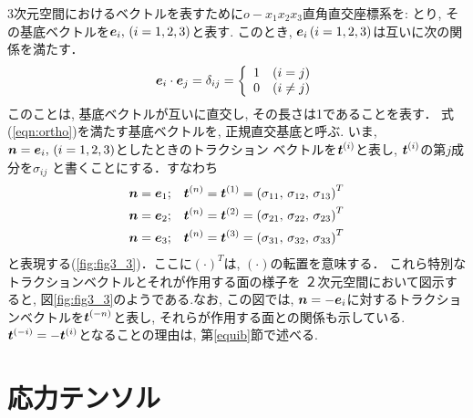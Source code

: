 \documentclass[10pt,a4j]{jarticle}
\begin{document}
3次元空間におけるベクトルを表すために$o-x_1x_2x_3$直角直交座標系を:
とり, その基底ベクトルを$\mbox{\boldmath $e$}_i,\, (i=1,2,3)$と表す.
このとき, $\mbox{\boldmath $e$}_i\, (i=1,2,3)$は互いに次の関係を満たす．
\begin{equation}
	\mbox{\boldmath $e$}_i\cdot \mbox{\boldmath $e$}_j=
	\delta_{ij}=
	\left\{
	\begin{array}{cc}
		1 & (i=j) \\
		0 & (i \neq j) \\
	\end{array}
	\right.
	\label{eqn:ortho}
\end{equation}
このことは, 基底ベクトルが互いに直交し, その長さは1であることを表す．
式(\ref{eqn:ortho})を満たす基底ベクトルを, 正規直交基底と呼ぶ.
いま, $\mbox{\boldmath $n$}=\mbox{\boldmath $e$}_i,\, (i=1,2,3)$としたときのトラクション
ベクトルを$\mbox{\boldmath $t$}^{(i)}$と表し, $\mbox{\boldmath $t$}^{(i)}$の第$j$成分を$\sigma_{ij}$
と書くことにする．すなわち
\begin{eqnarray}
	\mbox{\boldmath $n$}=\mbox{\boldmath $e$}_1 &;& \mbox{\boldmath $t$}^{(n)}=\mbox{\boldmath $t$}^{(1)}
		=\left( \sigma_{11},\, \sigma_{12},\, \sigma_{13}\right)^T \\
	\mbox{\boldmath $n$}=\mbox{\boldmath $e$}_2 &;& \mbox{\boldmath $t$}^{(n)}=\mbox{\boldmath $t$}^{(2)} 
		=\left( \sigma_{21},\, \sigma_{22},\, \sigma_{23}\right)^T \\
	\mbox{\boldmath $n$}=\mbox{\boldmath $e$}_3 &;& \mbox{\boldmath $t$}^{(n)}=\mbox{\boldmath $t$}^{(3)} 
		=\left( \sigma_{31},\, \sigma_{32},\, \sigma_{33}\right)^T 
\end{eqnarray}
と表現する(\ref{fig:fig3_3})．ここに$(\cdot)^T$は, $(\cdot)$の転置を意味する．
これら特別なトラクションベクトルとそれが作用する面の様子を
２次元空間において図示すると, 図\ref{fig:fig3_3}のようである.なお, この図では, 
$\mbox{\boldmath $n$}=-\mbox{\boldmath $e$}_i$に対するトラクションベクトルを$\mbox{\boldmath $t$}^{(-n)}$と表し, 
それらが作用する面との関係も示している.
$\mbox{\boldmath $t$}^{(-i)}=-\mbox{\boldmath $t$}^{(i)}$となることの理由は, 第\ref{equib}節で述べる.
\section{応力テンソル}
\end{document}
